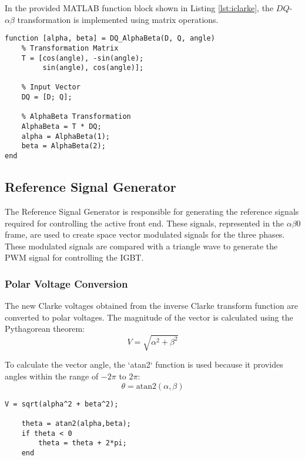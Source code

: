 In the provided MATLAB function block shown in Listing \ref{lst:iclarke}, the
\( DQ \)-\( \alpha\beta \) transformation is implemented using matrix
operations.\\

\begin{lstlisting}[style=MATLAB, caption={Three-Phase Phase-Locked Loop}, label={lst:iclarke}]
    function [alpha, beta] = DQ_AlphaBeta(D, Q, angle)
    % Transformation Matrix
    T = [cos(angle), -sin(angle);
         sin(angle), cos(angle)];
     
    % Input Vector
    DQ = [D; Q];
    
    % AlphaBeta Transformation
    AlphaBeta = T * DQ;
    alpha = AlphaBeta(1);
    beta = AlphaBeta(2);
end
\end{lstlisting}

\subsection{Reference Signal Generator}
The Reference Signal Generator is responsible for generating the reference
signals required for controlling the active front end. These signals,
represented in the \( \alpha\beta0 \) frame, are used to create space vector
modulated signals for the three phases. These modulated signals are compared
with a triangle wave to generate the PWM signal for controlling the IGBT.

\subsubsection{Polar Voltage Conversion}
The new Clarke voltages obtained from the inverse Clarke transform function are
converted to polar voltages. The magnitude of the vector is calculated using
the Pythagorean theorem:
\begin{equation*}
    V = \sqrt{\alpha^2 + \beta^2}
\end{equation*}

To calculate the vector angle, the `atan2` function is used because it provides
angles within the range of \( -2\pi \) to \( 2\pi \):
\begin{equation*}
    \theta = \text{atan2}(\alpha,\beta)
\end{equation*}

\begin{lstlisting}[style=MATLAB, caption={Polar Vector Calculation}, label={lst:polar}]
    V = sqrt(alpha^2 + beta^2);
    
    theta = atan2(alpha,beta);
    if theta < 0 
        theta = theta + 2*pi;
    end
\end{lstlisting}

